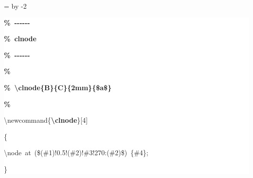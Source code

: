 \begingroup
\ttfamily
{}
=\textwidth
\advance{} by -2\fboxsep
\noindent
\colorbox{background}
{%
\parbox{\dimen255}
{%
\rule[-0.5ex]{0pt}{2.5ex}\hspace*{0.0em}\textcolor{G}{\textbf{\%~{-}{-}{-}{-}{-}{-}}}\\
\rule[-0.5ex]{0pt}{2.5ex}\hspace*{0.0em}\textcolor{G}{\textbf{\%~clnode}}\\
\rule[-0.5ex]{0pt}{2.5ex}\hspace*{0.0em}\textcolor{G}{\textbf{\%~{-}{-}{-}{-}{-}{-}}}\\
\rule[-0.5ex]{0pt}{2.5ex}\hspace*{0.0em}\textcolor{G}{\textbf{\%}}\\
\rule[-0.5ex]{0pt}{2.5ex}\hspace*{0.0em}\textcolor{G}{\textbf{\%~\textbackslash{}clnode\{B\}\{C\}\{2mm\}\{\$a\$\}}}\\
\rule[-0.5ex]{0pt}{2.5ex}\hspace*{0.0em}\textcolor{G}{\textbf{\%}}\\
\rule[-0.5ex]{0pt}{2.5ex}\hspace*{0.0em}\textbackslash{}newcommand\{\textcolor{R}{\textbf{\textbackslash{}clnode}}\}[4]\\
\rule[-0.5ex]{0pt}{2.5ex}\hspace*{0.0em}\{\\
\rule[-0.5ex]{0pt}{2.5ex}\hspace*{1.0em}\textbackslash{}node~at~(\$(\#1)!0.5!(\#2)!\#3!270:(\#2)\$)~\{\#4\};\\
\rule[-0.5ex]{0pt}{2.5ex}\hspace*{0.0em}\}}%
}%
\endgroup
